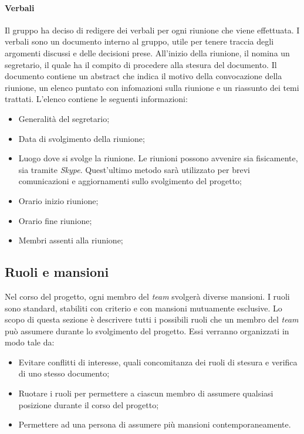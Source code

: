 			\paragraph{Verbali}
			Il gruppo ha deciso di redigere dei verbali per ogni riunione che viene effettuata. I verbali sono un documento interno al gruppo, utile per tenere traccia degli argomenti discussi e delle decisioni prese. All'inizio della riunione, il \textit{\RdP} nomina un segretario, il quale ha il compito di procedere alla stesura del documento. Il documento contiene un abstract che indica il motivo della convocazione della riunione, un elenco puntato con infomazioni sulla riunione e un riassunto dei temi trattati. L'elenco contiene le seguenti informazioni:
			\begin{itemize}
				\item Generalità del segretario;
				\item Data di svolgimento della riunione;
				\item Luogo dove si svolge la riunione. Le riunioni possono avvenire sia fisicamente, sia tramite \textit{Skype}. Quest'ultimo metodo sarà utilizzato per brevi comunicazioni e aggiornamenti sullo svolgimento del progetto;
				\item Orario inizio riunione;
				\item Orario fine riunione;
				\item Membri assenti alla riunione;
			\end{itemize}

	\subsection{Ruoli e mansioni}
	Nel corso del progetto, ogni membro del \textit{team} svolgerà diverse mansioni. I ruoli sono standard, stabiliti con criterio e con mansioni mutuamente esclusive. Lo scopo di questa sezione è descrivere tutti i possibili ruoli che un membro del \textit{team} può assumere durante lo svolgimento del progetto. Essi verranno organizzati in modo tale da:
	\begin{itemize}
		\item Evitare conflitti di interesse, quali concomitanza dei ruoli di stesura e verifica di uno stesso documento;
		\item Ruotare i ruoli per permettere a ciascun membro di assumere qualsiasi posizione durante il corso del progetto;
		\item Permettere ad una persona di assumere più mansioni contemporaneamente.
	\end{itemize}

